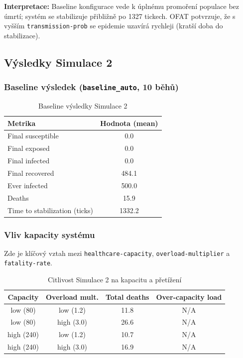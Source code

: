 \textbf{Interpretace:}  
Baseline konfigurace vede k úplnému promoření populace bez úmrtí; systém se stabilizuje přibližně po 1327 tickech. OFAT potvrzuje, že s vyšším \texttt{transmission-prob} se epidemie uzavírá rychleji (kratší doba do stabilizace).

\subsection{Výsledky Simulace 2}

\subsubsection{Baseline výsledek (\texttt{baseline\_auto}, 10 běhů)}

\begin{table}[h]
\centering
\begin{tabular}{l c}
\hline
\textbf{Metrika} & \textbf{Hodnota (mean)} \\
\hline
Final susceptible & 0.0 \\
Final exposed & 0.0 \\
Final infected & 0.0 \\
Final recovered & 484.1 \\
Ever infected & 500.0 \\
Deaths & 15.9 \\
Time to stabilization (ticks) & 1332.2 \\
\hline
\end{tabular}
\caption{Baseline výsledky Simulace 2}
\label{tab:s2_baseline}
\end{table}

\subsubsection{Vliv kapacity systému}

Zde je klíčový vztah mezi \texttt{healthcare-capacity}, \texttt{overload-multiplier} a \texttt{fatality-rate}.

\begin{table}[h]
\centering
\begin{tabular}{c c c c}
\hline
\textbf{Capacity} & \textbf{Overload mult.} & \textbf{Total deaths} & \textbf{Over-capacity load} \\
\hline
low (80) & low (1.2) & 11.8 & N/A \\
low (80) & high (3.0) & 26.6 & N/A \\
high (240) & low (1.2) & 10.7 & N/A \\
high (240) & high (3.0) & 16.9 & N/A \\
\hline
\end{tabular}
\caption{Citlivost Simulace 2 na kapacitu a přetížení}
\label{tab:s2_capacity}
\end{table}

